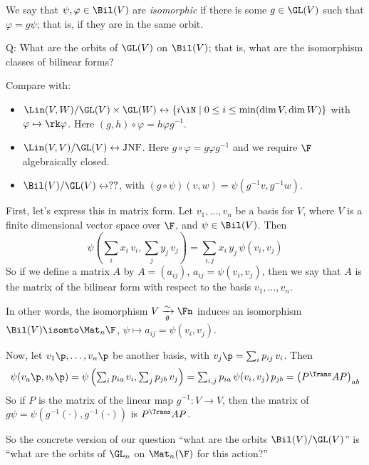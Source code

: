 \begin{definition}
	We say that $\psi,\varphi\in\Bil(V)$ are \emph{isomorphic} if there is some $g\in\GL(V)$ such that $\varphi=g\psi$; that is, if they are in the same orbit. %
\end{definition}

Q: What are the orbits of $\GL(V)$ on $\Bil(V)$; that is, what are the isomorphism classes of bilinear forms?

Compare with:
\begin{itemize}
	\item $\Lin(V,W)/\GL(V)\times\GL(W) \leftrightarrow \left\{i\iN \mid 0\leq i\leq \min(\dim V,\dim W)\right\}$ with $\varphi\mapsto \rk\varphi$. Here $(g,h)\circ\varphi = h\varphi g^{-1}$. %
	\item $\Lin(V,V)/\GL(V) \leftrightarrow \text{JNF}$. Here $g\circ\varphi=g\varphi g^{-1}$ and we require $\F$ algebraically closed. %
	\item $\Bil(V)/\GL(V) \leftrightarrow ??$,  with $(g\circ\psi)(v,w) = \psi(g^{-1}v, g^{-1} w)$. %
\end{itemize}
First, let's express this in matrix form. Let $v_1,\ldots,v_n$ be a basis for $V$, where $V$ is a finite dimensional vector space over $\F$, and $\psi\in\Bil(V)$. Then
\begin{equation*}
	\textstyle \psi\left( \sum_i x_i \, v_i, \sum_j y_j \, v_j \right) = \sum_{i,j} x_i \, y_j \,\psi(v_i,v_j) %
\end{equation*}
So if we define a matrix $A$ by $A=(a_{ij})$, $a_{ij} = \psi(v_i,v_j)$, then we say that $A$ is the matrix of the bilinear form with respect to the basis $v_1,\ldots,v_n$.

In other words, the  isomorphism $V \xrightarrow[\theta]{\sim} \Fn$ induces an isomorphism $\Bil(V)\isomto \Mat_n\F$,  $\psi\mapsto a_{ij} = \psi(v_i,v_j)$.

Now, let $v_1\p,\ldots,v_n\p$ be another basis, with $v_j\p = \sum_i p_{ij} \, v_i$. Then
\begin{equation*}
	\psi(v_a\p,v_b\p) = \textstyle \psi\left(\sum_i p_{ia} \, v_i, \sum_j p_{jb} \, v_j \right) %
	= \sum_{i,j} p_{ia}\,\psi(v_i,v_j) \,p_{jb}
	= \left( P^\Trans AP \right)_{ab}
\end{equation*}
So if $P$ is the matrix of the linear map $g^{-1}:V\to V$, then the matrix of $g\psi=\psi(g^{-1} (\cdot), g^{-1} (\cdot))$ is $P^\Trans AP$.

So the concrete version of our question ``what are the orbits $\Bil(V)/\GL(V)$'' is ``what are the orbits of $\GL_n$ on $\Mat_n(\F)$ for this action?''

